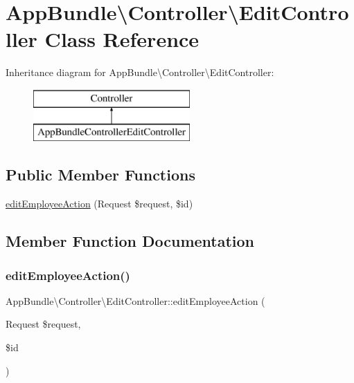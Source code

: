 \hypertarget{class_app_bundle_1_1_controller_1_1_edit_controller}{}\section{App\+Bundle\textbackslash{}Controller\textbackslash{}Edit\+Controller Class Reference}
\label{class_app_bundle_1_1_controller_1_1_edit_controller}
Inheritance diagram for App\+Bundle\textbackslash{}Controller\textbackslash{}Edit\+Controller\+:\begin{figure}[H]
\begin{center}
\leavevmode
\includegraphics[height=2.000000cm]{class_app_bundle_1_1_controller_1_1_edit_controller}
\end{center}
\end{figure}
\subsection*{Public Member Functions}
\begin{DoxyCompactItemize}
\item 
\mbox{\hyperlink{class_app_bundle_1_1_controller_1_1_edit_controller_a25c5e9d97113d26a4936c897412861cd}{edit\+Employee\+Action}} (Request \$request, \$id)
\end{DoxyCompactItemize}


\subsection{Member Function Documentation}
\mbox{\label{class_app_bundle_1_1_controller_1_1_edit_controller_a25c5e9d97113d26a4936c897412861cd}} 
\subsubsection{\texorpdfstring{edit\+Employee\+Action()}{editEmployeeAction()}}
{\footnotesize\ttfamily App\+Bundle\textbackslash{}\+Controller\textbackslash{}\+Edit\+Controller\+::edit\+Employee\+Action (\begin{DoxyParamCaption}\item[{Request}]{\$request,  }\item[{}]{\$id }\end{DoxyParamCaption})}

